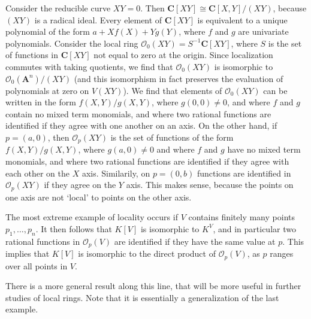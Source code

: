 \begin{example}
    Consider the reducible curve $XY = 0$. Then $\mathbf{C}[XY] \cong \mathbf{C}[X,Y]/(XY)$, because $(XY)$ is a radical ideal. Every element of $\mathbf{C}[XY]$ is equivalent to a unique polynomial of the form $a + Xf(X) + Yg(Y)$, where $f$ and $g$ are univariate polynomials. Consider the local ring $\mathcal{O}_0(XY) = S^{-1}\mathbf{C}[XY]$, where $S$ is the set of functions in $\mathbf{C}[XY]$ not equal to zero at the origin. Since localization commutes with taking quotients, we find that $\mathcal{O}_0(XY)$ is isomorphic to $\mathcal{O}_0(\mathbf{A}^n)/(XY)$ (and this isomorphism in fact preserves the evaluation of polynomials at zero on $V(XY)$). We find that elements of $\mathcal{O}_0(XY)$ can be written in the form $f(X,Y)/g(X,Y)$, where $g(0,0) \neq 0$, and where $f$ and $g$ contain no mixed term monomials, and where two rational functions are identified if they agree with one another on an axis. On the other hand, if $p = (a,0)$, then $\mathcal{O}_p(XY)$ is the set of functions of the form $f(X,Y)/g(X,Y)$, where $g(a,0) \neq 0$ and where $f$ and $g$ have no mixed term monomials, and where two rational functions are identified if they agree with each other on the $X$ axis. Similarily, on $p = (0,b)$ functions are identified in $\mathcal{O}_p(XY)$ if they agree on the $Y$ axis. This makes sense, because the points on one axis are not `local' to points on the other axis.
\end{example}

\begin{example}
    The most extreme example of locality occurs if $V$ contains finitely many points $p_1, \dots, p_n$. It then follows that $K[V]$ is isomorphic to $K^V$, and in particular two rational functions in $\mathcal{O}_p(V)$ are identified if they have the same value at $p$. This implies that $K[V]$ is isomorphic to the direct product of $\mathcal{O}_p(V)$, as $p$ ranges over all points in $V$.
\end{example}

There is a more general result along this line, that will be more useful in further studies of local rings. Note that it is essentially a generalization of the last example.

